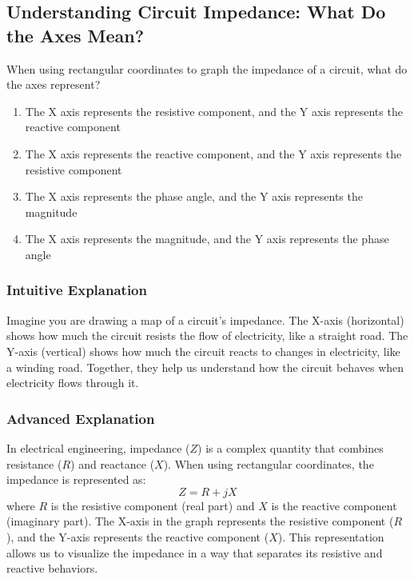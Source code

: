 \subsection{Understanding Circuit Impedance: What Do the Axes Mean?}

\begin{tcolorbox}[colback=gray!10!white,colframe=black!75!black,title=E5C09] When using rectangular coordinates to graph the impedance of a circuit, what do the axes represent?
    \begin{enumerate}[label=\Alph*,noitemsep]
        \item The X axis represents the resistive component, and the Y axis represents the reactive component
        \item The X axis represents the reactive component, and the Y axis represents the resistive component
        \item The X axis represents the phase angle, and the Y axis represents the magnitude
        \item The X axis represents the magnitude, and the Y axis represents the phase angle
    \end{enumerate}
\end{tcolorbox}

\subsubsection{Intuitive Explanation}
Imagine you are drawing a map of a circuit's impedance. The X-axis (horizontal) shows how much the circuit resists the flow of electricity, like a straight road. The Y-axis (vertical) shows how much the circuit reacts to changes in electricity, like a winding road. Together, they help us understand how the circuit behaves when electricity flows through it.

\subsubsection{Advanced Explanation}
In electrical engineering, impedance (\(Z\)) is a complex quantity that combines resistance (\(R\)) and reactance (\(X\)). When using rectangular coordinates, the impedance is represented as:
\[
Z = R + jX
\]
where \(R\) is the resistive component (real part) and \(X\) is the reactive component (imaginary part). The X-axis in the graph represents the resistive component (\(R\)), and the Y-axis represents the reactive component (\(X\)). This representation allows us to visualize the impedance in a way that separates its resistive and reactive behaviors.

